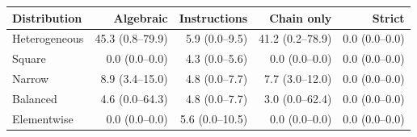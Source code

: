 \begin{tabular}{@{}lrrrr@{}}
\toprule
Distribution & Algebraic & Instructions & Chain only & Strict \\
\midrule
Heterogeneous & 45.3 (0.8--79.9) & 5.9 (0.0--9.5) & 41.2 (0.2--78.9) & 0.0 (0.0--0.0) \\
Square & 0.0 (0.0--0.0) & 4.3 (0.0--5.6) & 0.0 (0.0--0.0) & 0.0 (0.0--0.0) \\
Narrow & 8.9 (3.4--15.0) & 4.8 (0.0--7.7) & 7.7 (3.0--12.0) & 0.0 (0.0--0.0) \\
Balanced & 4.6 (0.0--64.3) & 4.8 (0.0--7.7) & 3.0 (0.0--62.4) & 0.0 (0.0--0.0) \\
Elementwise & 0.0 (0.0--0.0) & 5.6 (0.0--10.5) & 0.0 (0.0--0.0) & 0.0 (0.0--0.0) \\
\bottomrule
\end{tabular}
